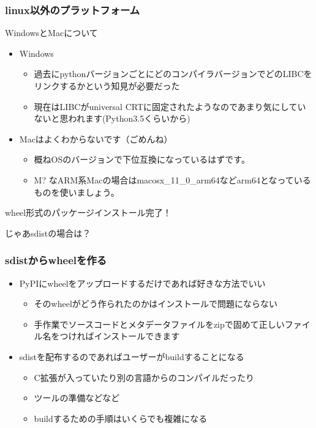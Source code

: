 \documentclass[aspectratio=169]{beamer}
\begin{document}
\begin{frame}
\frametitle{linux以外のプラットフォーム}
WindowsとMacについて
\begin{itemize}
\item Windows
\begin{itemize}
\item 過去にpythonバージョンごとにどのコンパイラバージョンでどのLIBCをリンクするかという知見が必要だった
\item 現在はLIBCがuniversal CRTに固定されたようなのであまり気にしていないと思われます(Python3.5くらいから)
\end{itemize}
\item Macはよくわからないです（ごめんね）
\begin{itemize}
\item 概ねOSのバージョンで下位互換になっているはずです。
\item M? なARM系Macの場合はmacosx\_11\_0\_arm64などarm64となっているものを使いましょう。
\end{itemize}
\end{itemize}
\end{frame}

\begin{frame}
\begin{large}
wheel形式のパッケージインストール完了！
\end{large}
\end{frame}

\begin{frame}
\begin{large}
じゃあsdistの場合は？
\end{large}
\end{frame}

\begin{frame}
\frametitle{sdistからwheelを作る}
\begin{itemize}
\item PyPIにwheelをアップロードするだけであれば好きな方法でいい
\begin{itemize}
\item そのwheelがどう作られたのかはインストールで問題にならない
\item 手作業でソースコードとメタデータファイルをzipで固めて正しいファイル名をつければインストールできます
\end{itemize}
\item sdistを配布するのであればユーザーがbuildすることになる
\begin{itemize}
\item C拡張が入っていたり別の言語からのコンパイルだったり
\item ツールの準備などなど
\item buildするための手順はいくらでも複雑になる
\end{itemize}
\end{itemize}
\end{frame}
\end{document}
